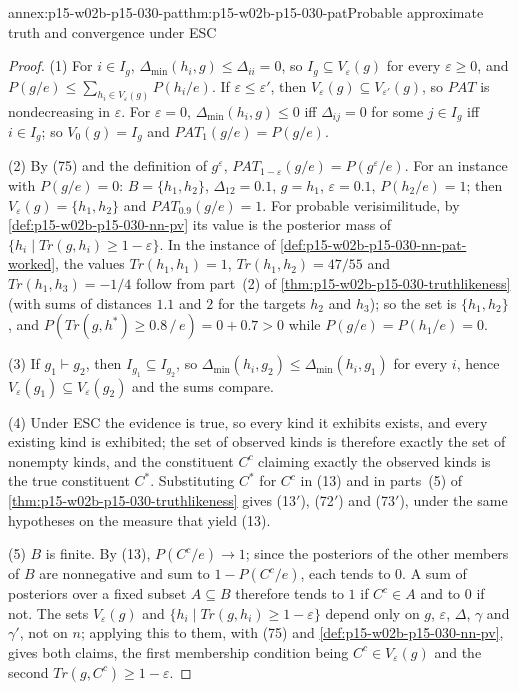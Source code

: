 \begin{annexitem}{annex:p15-w02b-p15-030-pat}{thm:p15-w02b-p15-030-pat}{Probable approximate truth and convergence under ESC}
\begin{proof}
(1) For \(i\in I_g\), \(\Delta_{\min}(h_i,g)\leq\Delta_{ii}=0\), so
\(I_g\subseteq V_\varepsilon(g)\) for every \(\varepsilon\geq0\), and
\(P(g/e)\leq\sum_{h_i\in V_\varepsilon(g)}P(h_i/e)\). If \(\varepsilon\leq\varepsilon'\),
then \(V_\varepsilon(g)\subseteq V_{\varepsilon'}(g)\), so \(PAT\) is nondecreasing in
\(\varepsilon\). For \(\varepsilon=0\), \(\Delta_{\min}(h_i,g)\leq0\) iff \(\Delta_{ij}=0\)
for some \(j\in I_g\) iff \(i\in I_g\); so \(V_0(g)=I_g\) and \(PAT_1(g/e)=P(g/e)\).

(2) By (75) and the definition of \(g^\varepsilon\),
\(PAT_{1-\varepsilon}(g/e)=P(g^\varepsilon/e)\). For an instance with
\(P(g/e)=0\): \(B=\{h_1,h_2\}\), \(\Delta_{12}=0.1\), \(g=h_1\), \(\varepsilon=0.1\),
\(P(h_2/e)=1\); then \(V_\varepsilon(g)=\{h_1,h_2\}\) and \(PAT_{0.9}(g/e)=1\).
For probable verisimilitude, by \cref{def:p15-w02b-p15-030-nn-pv} its value is
the posterior mass of \(\{h_i\mid Tr(g,h_i)\geq1-\varepsilon\}\). In the
instance of \cref{def:p15-w02b-p15-030-nn-pat-worked}, the values
\(Tr(h_1,h_1)=1\), \(Tr(h_1,h_2)=47/55\) and \(Tr(h_1,h_3)=-1/4\) follow from
part~(2) of \cref{thm:p15-w02b-p15-030-truthlikeness} (with sums of distances
\(1.1\) and \(2\) for the targets \(h_2\) and \(h_3\)); so the set is
\(\{h_1,h_2\}\), and \(P(Tr(g,h^*)\geq0.8\,/\,e)=0+0.7>0\) while \(P(g/e)=P(h_1/e)=0\).

(3) If \(g_1\vdash g_2\), then \(I_{g_1}\subseteq I_{g_2}\), so
\(\Delta_{\min}(h_i,g_2)\leq\Delta_{\min}(h_i,g_1)\) for every \(i\), hence
\(V_\varepsilon(g_1)\subseteq V_\varepsilon(g_2)\) and the sums compare.

(4) Under ESC the evidence is true, so every kind it exhibits exists, and
every existing kind is exhibited; the set of observed kinds is therefore
exactly the set of nonempty kinds, and the constituent \(C^c\) claiming
exactly the observed kinds is the true constituent \(C^*\). Substituting
\(C^*\) for \(C^c\) in (13) and in parts~(5) of
\cref{thm:p15-w02b-p15-030-truthlikeness} gives (13\('\)), (72\('\)) and
(73\('\)), under the same hypotheses on the measure that yield (13).

(5) \(B\) is finite. By (13), \(P(C^c/e)\to1\); since the posteriors of the
other members of \(B\) are nonnegative and sum to \(1-P(C^c/e)\), each tends to
\(0\). A sum of posteriors over a fixed subset \(A\subseteq B\) therefore tends to
\(1\) if \(C^c\in A\) and to \(0\) if not. The sets \(V_\varepsilon(g)\) and
\(\{h_i\mid Tr(g,h_i)\geq1-\varepsilon\}\) depend only on \(g\), \(\varepsilon\),
\(\Delta\), \(\gamma\) and \(\gamma'\), not on \(n\); applying this to them, with
(75) and \cref{def:p15-w02b-p15-030-nn-pv}, gives both claims, the first
membership condition being \(C^c\in V_\varepsilon(g)\) and the second
\(Tr(g,C^c)\geq1-\varepsilon\).


\end{proof}
\end{annexitem}
